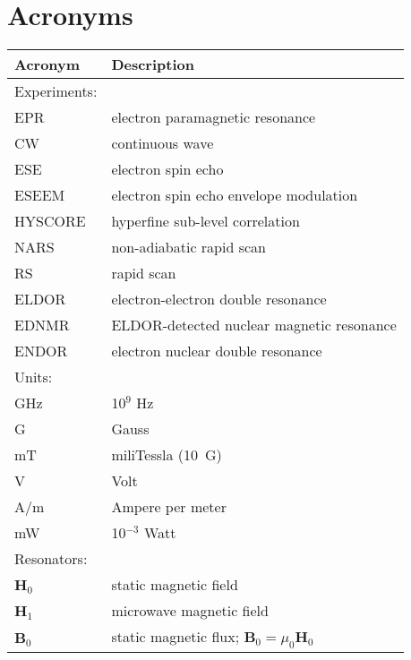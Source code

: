 \documentclass[11pt,a4paper,openany,twoside,english,titlepage=true]{scrbook}
\begin{document}
\listoffigures\newpage

\listoftables\newpage

\newpage
\chapter*{Acronyms}
\begin{table}[ht!]
\small
{}
\begin{tabular}{ll}
\textbf{Acronym}     & \textbf{Description} \\ \hline \hline
\rowcolor{LightCyan}
Experiments:    & \\ \hline
EPR             & electron paramagnetic resonance \\
CW              & continuous wave \\
ESE             & electron spin echo \\
ESEEM           & electron spin echo envelope modulation \\
HYSCORE         & hyperfine sub-level correlation \\
NARS            & non-adiabatic rapid scan \\
RS              & rapid scan \\
ELDOR           & electron-electron double resonance \\
EDNMR           & ELDOR-detected nuclear magnetic resonance \\
ENDOR           & electron nuclear double resonance \\ \hline \hline
\rowcolor{LightCyan}
Units:          & \\ \hline
GHz             & 10$^9$ Hz \\
G               & Gauss \\
mT              & miliTessla (10~G) \\
V               & Volt \\
A/m             & Ampere per meter \\
mW              & 10$^{-3}$ Watt \\ \hline \hline
\rowcolor{LightCyan}
Resonators:     & \\ \hline
\textbf{H}$_0$  & static magnetic field \\
\textbf{H}$_1$  & microwave magnetic field \\
\textbf{B}$_0$  & static magnetic flux; $\textbf{B}_0 = \mu_0 \textbf{H}_0$ \\

\end{tabular}
\end{table}
\end{document}
